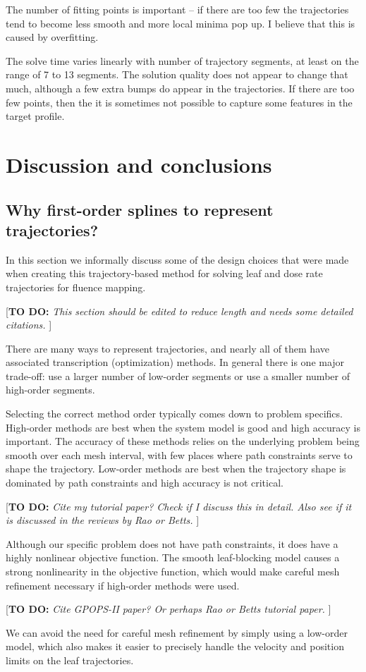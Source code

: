 \documentclass[12pt]{article}
\newcommand{\todo}[1]{{\color{lightblue}\par {[{\bf TO DO: } {\em #1}} ] \\    }}
\begin{document}
The number of fitting points is important -- if there are too few the trajectories tend to
become less smooth and more local minima pop up. I believe that this is caused by overfitting.

The solve time varies linearly with number of trajectory segments, at least on the range of 7 to 13 segments.
The solution quality does not appear to change that much, although a few extra bumps do appear in the trajectories.
If there are too few points, then the it is sometimes not possible to capture some features in the target profile.

\section{Discussion and conclusions}


\subsection{Why first-order splines to represent trajectories?}
\label{sec:WhyUseLinearSplines}

In this section we informally discuss some of the design choices that were made when creating this
trajectory-based method for solving leaf and dose rate trajectories for fluence mapping.

\todo{This section should be edited to reduce length and needs some detailed citations.}

There are many ways to represent trajectories, and nearly all of them have associated transcription (optimization) methods.
In general there is one major trade-off:
use a larger number of low-order segments or
use a smaller number of high-order segments.

Selecting the correct method order typically comes down to problem specifics.
High-order methods are best when the system model is good and high accuracy is important.
The accuracy of these methods relies on the underlying problem being smooth over each
mesh interval, with few places where path constraints serve to shape the trajectory.
Low-order methods are best when the trajectory shape is dominated by path constraints and
high accuracy is not critical.
\todo{Cite my tutorial paper? Check if I discuss this in detail.
Also see if it is discussed in the reviews by Rao or Betts.}

Although our specific problem does not have path constraints, it does have a highly nonlinear objective function.
The smooth leaf-blocking model causes a strong nonlinearity in the objective function,
which would make careful mesh refinement necessary if high-order methods were used.
\todo{Cite GPOPS-II paper? Or perhaps Rao or Betts tutorial paper.}
We can avoid the need for careful mesh refinement by simply using a low-order model,
which also makes it easier to precisely handle the velocity and position limits on the leaf trajectories.
\end{document}
